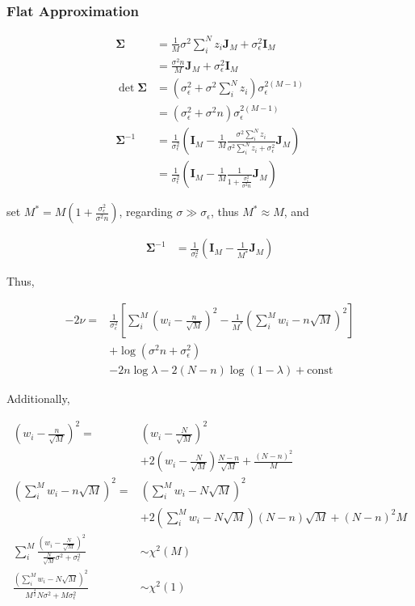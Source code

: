 \documentclass[notitlepage]{article}
\begin{document}
\subsubsection{Flat Approximation}

\begin{align}
    \bm{\Sigma} &= \frac{1}{M}\sigma^2\sum_i^N z_i\bm{J}_M + \sigma_\epsilon^2\bm{I}_M \\
    &= \frac{\sigma^2n}{M}\bm{J}_M+\sigma_\epsilon^2\bm{I}_M \\
    \det\bm{\Sigma} &= (\sigma_\epsilon^2 + \sigma^2\sum_i^N z_i)\sigma_\epsilon^{2(M-1)} \\
    &= (\sigma_\epsilon^2 + \sigma^2n)\sigma_\epsilon^{2(M-1)} \\
    \bm{\Sigma}^{-1} &= \frac{1}{\sigma_\epsilon^2}(\bm{I}_M - \frac{1}{M}\frac{\sigma^2\sum_i^N z_i}{\sigma^2\sum_i^N z_i+\sigma_\epsilon^2}\bm{J}_M) \\
    &= \frac{1}{\sigma_\epsilon^2}(\bm{I}_M - \frac{1}{M}\frac{1}{1+\frac{\sigma_\epsilon^2}{\sigma^2n}}\bm{J}_M)
\end{align}

set $M^\ast = M(1+\frac{\sigma_\epsilon^2}{\sigma^2n})$, regarding $\sigma\gg\sigma_\epsilon$, thus $M^\ast\approx M$, and

\begin{align}
    \bm{\Sigma}^{-1} &= \frac{1}{\sigma_\epsilon^2}(\bm{I}_M - \frac{1}{M^\ast}\bm{J}_M)
\end{align}

Thus, 

\begin{align}
    -2\nu =& \frac{1}{\sigma_\epsilon^2}[\sum_i^M(w_i-\frac{n}{\sqrt{M}})^2-\frac{1}{M^\ast}(\sum_i^M w_i-n\sqrt{M})^2] \\
    &+ \log(\sigma^2n+\sigma_\epsilon^2) \\
    &- 2n\log\lambda - 2(N-n)\log(1-\lambda) + \mathrm{const}
\end{align}

Additionally, 

\begin{align}
    (w_i-\frac{n}{\sqrt{M}})^2 =& (w_i - \frac{N}{\sqrt{M}})^2 \\ 
    &+ 2(w_i - \frac{N}{\sqrt{M}})\frac{N-n}{\sqrt{M}} + \frac{(N-n)^2}{M} \\
    (\sum_i^M w_i-n\sqrt{M})^2 =& (\sum_i^M w_i-N\sqrt{M})^2 \\
    &+ 2(\sum_i^M w_i-N\sqrt{M})(N-n)\sqrt{M} + (N-n)^2M \\
    \sum_i^M\frac{(w_i - \frac{N}{\sqrt{M}})^2}{\frac{N}{\sqrt{M}}\sigma^2+\sigma_\epsilon^2} &\sim \chi^2(M) \\
    \frac{(\sum_i^M w_i-N\sqrt{M})^2}{M^{\frac{3}{2}}N\sigma^2+M\sigma_\epsilon^2} &\sim \chi^2(1)
\end{align}
\end{document}
